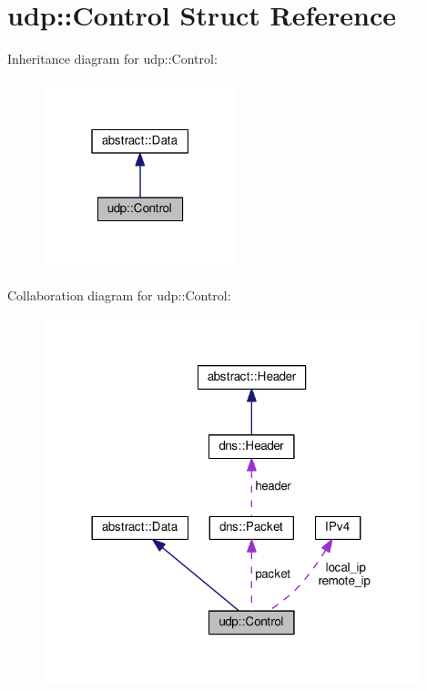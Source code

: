 \hypertarget{structudp_1_1Control}{}\section{udp\+:\+:Control Struct Reference}
\label{structudp_1_1Control}


Inheritance diagram for udp\+:\+:Control\+:
\nopagebreak
\begin{figure}[H]
\begin{center}
\leavevmode
\includegraphics[width=159pt]{structudp_1_1Control__inherit__graph}
\end{center}
\end{figure}


Collaboration diagram for udp\+:\+:Control\+:
\nopagebreak
\begin{figure}[H]
\begin{center}
\leavevmode
\includegraphics[width=310pt]{structudp_1_1Control__coll__graph}
\end{center}
\end{figure}

